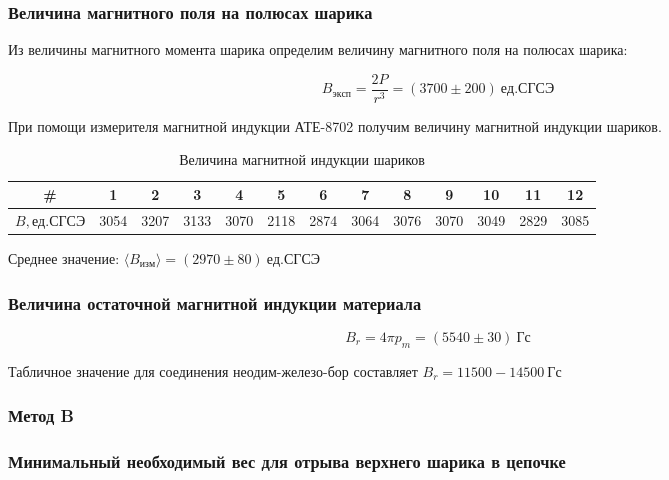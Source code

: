\documentclass[a4paper, 12pt]{article}
\begin{document}
            \subsubsection{Величина магнитного поля на полюсах шарика}

                Из величины магнитного момента шарика определим величину магнитного поля на полюсах шарика:

                $$
                    B_{эксп} = \frac{2P}{r^3} = (3700 \pm 200)~ед. СГСЭ
                $$

                При помощи измерителя магнитной индукции АТЕ-8702 получим величину магнитной индукции шариков.

                \begin{table}[!ht]
                    \centering
                    \begin{tabular}{|c|c|c|c|c|c|c|c|c|c|c|c|c|}
                        \hline

                        \# & 1 & 2 & 3 & 4 & 5 & 6 & 7 & 8 & 9 & 10 & 11 & 12\\ \hline
                        $B, ед. СГСЭ$ & 3054 & 3207 & 3133 & 3070 & 2118 & 2874 & 3064 & 3076 & 3070 & 3049 & 2829 & 3085\\ \hline

                    \end{tabular}
                    \caption{Величина магнитной индукции шариков}
                    \label{table:B}
                \end{table}

                Среднее значение: $\langle B_{изм} \rangle = (2970 \pm 80)~ед. СГСЭ$

            \subsubsection{Величина остаточной магнитной индукции материала}

                $$
                    B_r = 4 \pi p_m = (5540 \pm 30)~Гс
                $$

                Табличное значение для соединения неодим-железо-бор составляет $B_r = 11500-14500~Гс$

            \subsubsection*{\textbf{Метод B}}
            \subsubsection{Минимальный необходимый вес для отрыва верхнего шарика в цепочке}
\end{document}
